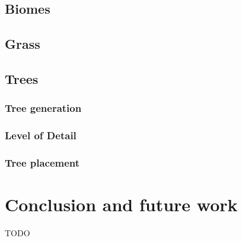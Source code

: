 \documentclass[journal, letterpaper]{IEEEtran}
\begin{document}
\subsection{Biomes}\label{Biomes}

\subsection{Grass}

\subsection{Trees}

\subsubsection{Tree generation}

\subsubsection{Level of Detail}

\subsubsection{Tree placement}

\section{Conclusion and future work}
TODO


%

\end{document}
